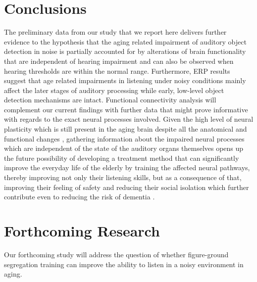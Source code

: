 \documentclass[a0,portrait]{a0poster}
\begin{document}
\begin{multicols}{2}

\section*{Conclusions}

The preliminary data from our study that we report here delivers further evidence to the hypothesis that the aging related impairment of auditory object detection in noise is partially accounted for by alterations of brain functionality that are independent of hearing impairment and can also be observed when hearing thresholds are within the normal range. Furthermore, ERP results suggest that age related impairments in listening under noisy conditions mainly affect the later stages of auditory processing while early, low-level object detection mechanisms are intact. Functional connectivity analysis will complement our current findings with further data that might prove informative with regards to the exact neural processes involved. Given the high level of neural plasticity which is still present in the aging brain despite all the anatomical and functional changes \autocite{Grady2012}, gathering information about the impaired neural processes which are independent of the state of the auditory organs themselves opens up the future possibility of developing a treatment method that can significantly improve the everyday life of the elderly by training the affected neural pathways, thereby improving not only their listening skills, but as a consequence of that, improving their feeling of safety and reducing their social isolation which further contribute even to reducing the risk of dementia \autocite{Slade2020}.


\section*{Forthcoming Research}

Our forthcoming study will address the question of whether figure-ground segregation training can improve the ability to listen in a noisy environment in aging.


\end{multicols}
\end{document}
